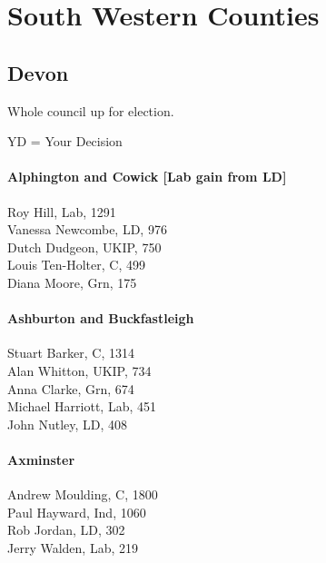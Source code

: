 \documentclass[a4paper,openany,10pt]{book}
\begin{document}
\chapter{South Western Counties}

\section{Devon}

Whole council up for election.

YD = Your Decision



\subsubsection*{Alphington and Cowick \hspace*{\fill}\nolinebreak[1]%
\enspace\hspace*{\fill}
[Lab gain from LD]}



Roy Hill, Lab, 1291\\
Vanessa Newcombe, LD, 976\\
Dutch Dudgeon, UKIP, 750\\
Louis Ten-Holter, C, 499\\
Diana Moore, Grn, 175\\


\subsubsection*{Ashburton and Buckfastleigh}



Stuart Barker, C, 1314\\
Alan Whitton, UKIP, 734\\
Anna Clarke, Grn, 674\\
Michael Harriott, Lab, 451\\
John Nutley, LD, 408\\


\subsubsection*{Axminster}



Andrew Moulding, C, 1800\\
Paul Hayward, Ind, 1060\\
Rob Jordan, LD, 302\\
Jerry Walden, Lab, 219\\
\end{document}
